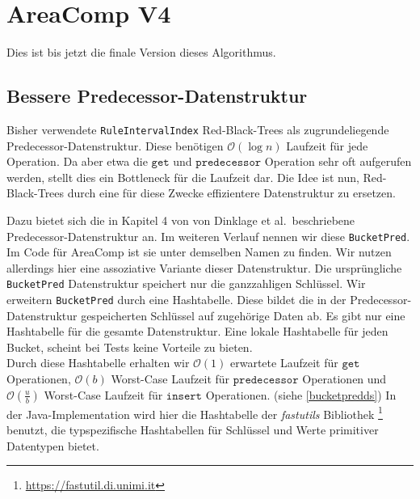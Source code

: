 



\section{AreaComp V4}
\label{v4}

Dies ist bis jetzt die finale Version dieses Algorithmus. 

\subsection{Bessere Predecessor-Datenstruktur}

Bisher verwendete \texttt{RuleIntervalIndex} Red-Black-Trees als zugrundeliegende Predecessor-Datenstruktur. Diese benötigen $\mathcal{O}(\log n)$ Laufzeit für jede Operation. Da aber etwa die $\texttt{get}$ und $\texttt{predecessor}$ Operation sehr oft aufgerufen werden, stellt dies ein Bottleneck für die Laufzeit dar.
Die Idee ist nun, Red-Black-Trees durch eine für diese Zwecke effizientere Datenstruktur zu ersetzen.

Dazu bietet sich die in Kapitel 4 von \cite{dinklage_engineering_2021} von Dinklage et al.\ beschriebene Predecessor-Datenstruktur an. Im weiteren Verlauf nennen wir diese \texttt{BucketPred}. Im Code für AreaComp ist sie unter demselben Namen zu finden. Wir nutzen allerdings hier eine assoziative Variante dieser Datenstruktur. Die ursprüngliche \texttt{BucketPred} Datenstruktur speichert nur die ganzzahligen Schlüssel. Wir erweitern \texttt{BucketPred} durch eine Hashtabelle. Diese bildet die in der Predecessor-Datenstruktur gespeicherten Schlüssel auf zugehörige Daten ab. Es gibt nur eine Hashtabelle für die gesamte Datenstruktur.   
Eine lokale Hashtabelle für jeden Bucket, scheint bei Tests keine Vorteile zu bieten.\\
Durch diese Hashtabelle erhalten wir $\mathcal{O}(1)$ erwartete Laufzeit für $\texttt{get}$ Operationen, $\mathcal{O}(b)$ Worst-Case Laufzeit für $\texttt{predecessor}$ Operationen und $\mathcal{O}(\tfrac{u}{b})$ Worst-Case Laufzeit für $\texttt{insert}$ Operationen. (siehe \autoref{bucketpredds}) In der Java-Implementation wird hier die Hashtabelle der \emph{fastutils} Bibliothek \footnote{\url{https://fastutil.di.unimi.it}} benutzt, die typspezifische Hashtabellen für Schlüssel und Werte primitiver Datentypen bietet. 

